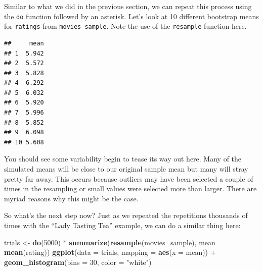\documentclass[]{tufte-book}
\newenvironment{Shaded}{\begin{snugshade}}{\end{snugshade}}
\newcommand{\KeywordTok}[1]{\textcolor[rgb]{0.13,0.29,0.53}{\textbf{{#1}}}}
\newcommand{\DataTypeTok}[1]{\textcolor[rgb]{0.13,0.29,0.53}{{#1}}}
\newcommand{\DecValTok}[1]{\textcolor[rgb]{0.00,0.00,0.81}{{#1}}}
\newcommand{\StringTok}[1]{\textcolor[rgb]{0.31,0.60,0.02}{{#1}}}
\newcommand{\NormalTok}[1]{{#1}}
\begin{document}
Similar to what we did in the previous section, we can repeat this
process using the \texttt{do} function followed by an asterisk. Let's
look at 10 different bootstrap means for \texttt{ratings} from
\texttt{movies\_sample}. Note the use of the \texttt{resample} function
here.

\begin{Shaded}
\end{Shaded}

\begin{verbatim}
##     mean
## 1  5.942
## 2  5.572
## 3  5.828
## 4  6.292
## 5  6.032
## 6  5.920
## 7  5.996
## 8  5.852
## 9  6.098
## 10 5.608
\end{verbatim}

You should see some variability begin to tease its way out here. Many of
the simulated means will be close to our original sample mean but many
will stray pretty far away. This occurs because outliers may have been
selected a couple of times in the resampling or small values were
selected more than larger. There are myriad reasons why this might be
the case.

So what's the next step now? Just as we repeated the repetitions
thousands of times with the ``Lady Tasting Tea'' example, we can do a
similar thing here:

\begin{Shaded}
\begin{Highlighting}[]
\NormalTok{trials <-}\StringTok{ }\KeywordTok{do}\NormalTok{(}\DecValTok{5000}\NormalTok{) *}\StringTok{ }\KeywordTok{summarize}\NormalTok{(}\KeywordTok{resample}\NormalTok{(movies_sample), }
                                \DataTypeTok{mean =} \KeywordTok{mean}\NormalTok{(rating))}
\KeywordTok{ggplot}\NormalTok{(}\DataTypeTok{data =} \NormalTok{trials, }\DataTypeTok{mapping =} \KeywordTok{aes}\NormalTok{(}\DataTypeTok{x =} \NormalTok{mean)) +}
\StringTok{  }\KeywordTok{geom_histogram}\NormalTok{(}\DataTypeTok{bins =} \DecValTok{30}\NormalTok{, }\DataTypeTok{color =} \StringTok{"white"}\NormalTok{)}
\end{Highlighting}
\end{Shaded}
\end{document}
